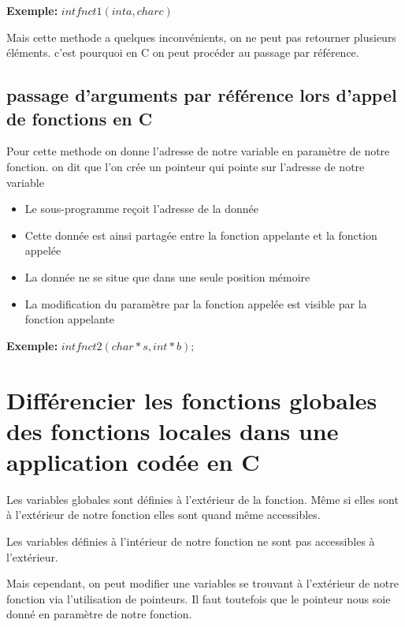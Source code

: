 \textbf{Exemple: } $int fnct1 (int a, char c)$

Mais cette methode a quelques inconvénients, on ne peut pas retourner plusieurs éléments. c'est pourquoi en C on peut procéder au passage par référence.


\subsection{passage d'arguments par référence lors d’appel de fonctions en C}

Pour cette methode on donne l'adresse de notre variable en paramètre de notre fonction. on dit que l'on crée un pointeur qui pointe sur l'adresse de notre variable

\begin{itemize}
    \item Le sous-programme reçoit l'adresse de la donnée
    \item Cette donnée est ainsi partagée entre la fonction appelante et la fonction appelée
    \item La donnée ne se situe que dans une seule position mémoire
    \item La modification du paramètre par la fonction appelée est visible par la fonction appelante
\end{itemize}

\textbf{Exemple: } $int fnct2 (char* s, int* b);$





\section{Différencier les fonctions globales des fonctions locales dans une application codée
en C}

Les variables globales sont définies à l'extérieur de la fonction. Même si elles sont à l'extérieur de notre fonction elles sont quand même accessibles.

Les variables définies à l'intérieur de notre fonction ne sont pas accessibles à l'extérieur.

Mais cependant, on peut modifier une variables se trouvant à l'extérieur de notre fonction via l'utilisation de pointeurs. Il faut toutefois que le pointeur nous soie donné en paramètre de notre fonction.

